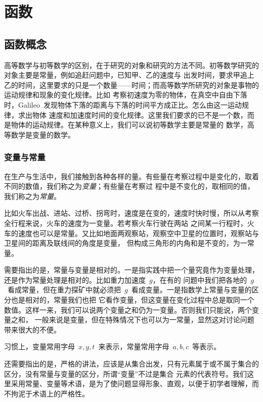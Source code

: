 

\chapter{函\emspace 数}\label{ch:1}

\section{函数概念}\label{sec:1.1}

高等数学与初等数学的区别，在于研究的对象和研究的方法不同。初等数学研究的对象主要是常量，例如追赶问题中，已知甲、乙的速度与
出发时间，要求甲追上乙的时间，这里要求的只是一个数量——时间；而高等数学所研究的对象是事物的运动规律和现象的变化规律。比如
考察初速度为零的物体，在真空中自由下落时，Galileo~发现物体下落的距离与下落的时间平方成正比。怎么由这一运动规律，求出物体
速度和加速度时间的变化规律。这里我们要求的已不是一个数，而是物体的运动规律。在某种意义上，我们可以说初等数学主要是常量的
数学，高等数学是变量的数学。

\subsection{变量与常量}

在生产与生活中，我们接触到各种各样的量。有些量在考察过程中是变化的，取着不同的数值，我们称之为\emph{变量}；有些量在考察过
程中是不变化的，取相同的值，我们称之为\emph{常量}。

比如火车出战、进站、过桥、拐弯时，速度是在变的，速度时快时慢，所以从考察全行程来说，火车的速度为一变量。若考察火车行驶在两站
之间某一行程时，火车的速度也可以是常量。又比如地面两观察站，观察空中卫星的位置时，观察站与卫星间的距离及联线间的角度是变量，%
但构成三角形的内角和是不变的，为一常量。

需要指出的是，常量与变量是相对的。一是指实践中把一个量究竟作为变量处理，还是作为常量处理是相对的。比如重力加速度~$g$，在有的
问题中我们把各地的~$g$~看成常量，但在重力探矿中就必须把~$g$~看成变量。一是指数学上常量与变量的区分也是相对的，常量我们也把
它看作变量，但这变量在变化过程中总是取同一个数值。这样一来，我们可以说两个变量之和仍为一变量。否则我们只能说，两个变量之和，%
一般来说是变量，但在特殊情况下也可以为一常量，显然这对讨论问题带来很大的不便。

习惯上，变量常用字母~$x,y,t$~来表示，常量常用字母~$a,b,c$~等表示。

还需要指出的是，严格的讲法，应该是从集合出发，只有元素属于或不属于集合的区分，没有常量与变量的区分，所谓“变量”不过是集合
元素的代表符号。我们这里采用常量、变量等术语，是为了使问题显得形象、直观，以便于初学者理解，而不拘泥于术语上的严格性。

